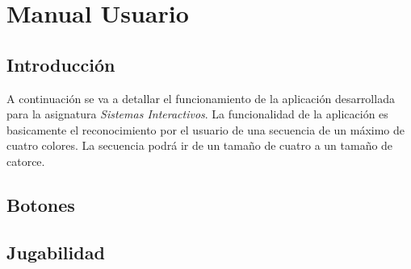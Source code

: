 \documentclass[12pt, twosides, a4paper]{book}
\begin{document}

\chapter{Manual Usuario}
\section{Introducción}
\par A continuación se va a detallar el funcionamiento de la aplicación desarrollada para la asignatura \emph{Sistemas Interactivos}. La funcionalidad de la aplicación es basicamente el reconocimiento por el usuario de una secuencia de un máximo de cuatro colores. La secuencia podrá ir de un tamaño de cuatro a un tamaño de catorce. 
\section{Botones}



\section{Jugabilidad}
	
\end{document}
